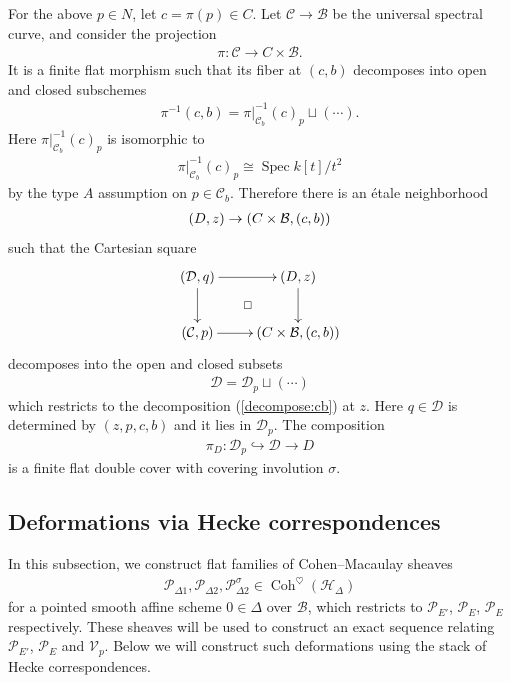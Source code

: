 \documentclass[11pt,oneside,a4paper,mathscr]{amsart}
\makeatletter
\theoremstyle{definition}
\newcommand{\cH}{\mathcal{H}}
\newcommand{\cB}{\mathcal{B}}
\newcommand{\cC}{\mathcal{C}}
\newcommand{\cP}{\mathcal{P}}
\newcommand{\cD}{\mathcal{D}}
\newcommand{\diasquare}{\ar@{}[rd]|\square}
\newcommand{\Coh}{\operatorname{Coh}}
\newcommand{\Spec}{\operatorname{Spec}}
\makeatother
\begin{document}
For the above $p\in N$, let $c=\pi(p) \in C$. 
Let $\cC \to \cB$ be the universal spectral curve, and consider the projection 
\begin{align*}
    \pi \colon \cC \to C\times \cB.
\end{align*}
It is a finite flat morphism such that its fiber at $(c, b)$ decomposes into open and closed subschemes
\begin{align}\label{decompose:cb}
    \pi^{-1}(c, b)=\pi|_{\cC_b}^{-1}(c)_p \sqcup (\cdots).
\end{align}
Here $\pi|_{\cC_b}^{-1}(c)_p$ is isomorphic to 
\begin{align*}
    \pi|_{\cC_b}^{-1}(c)_p \cong \Spec k[t]/t^2
\end{align*}
by the type $A$ assumption on $p \in \cC_b$.
Therefore there is an \'{e}tale neighborhood 
\begin{align}\notag
(D, z) \to (C\times \cB, (c, b)) 
\end{align}
such that the Cartesian square 
\begin{align}\label{etale:D}
\xymatrix{
(\cD, q) \ar[r] \ar[d] \diasquare & (D, z) \ar[d] \\
(\cC, p) \ar[r] &(C\times \cB, (c, b))
}
\end{align}
decomposes into the open and closed subsets
\begin{align*}
\cD=\cD_p \sqcup (\cdots)
\end{align*}
which restricts to the decomposition (\ref{decompose:cb}) at $z$. 
Here $q\in \cD$ is determined by $(z, p, c, b)$ and it lies in $\cD_p$.
The composition  
\begin{align}\label{map:D}
\pi_D \colon 
    \cD_p \hookrightarrow \cD  \to D 
\end{align}
is a finite flat double cover with covering involution $\sigma$. 

\subsection{Deformations via Hecke correspondences}
In this subsection, we construct flat families of Cohen--Macaulay 
sheaves 
\begin{align*}
    \cP_{\Delta 1}, \cP_{\Delta 2}, \cP_{\Delta 2}^{\sigma}\in \Coh^{\heartsuit}(\cH_{\Delta})
\end{align*}
for a pointed smooth affine scheme $0\in \Delta$ over $\cB$, which 
restricts to $\cP_{E'}$, $\cP_E$, $\cP_E$ respectively. 
These sheaves will be used to construct an exact sequence relating 
$\cP_{E'}$, $\cP_E$ and $\mathcal{V}_p$. Below we will construct such deformations using the stack of Hecke correspondences. 
\end{document}
